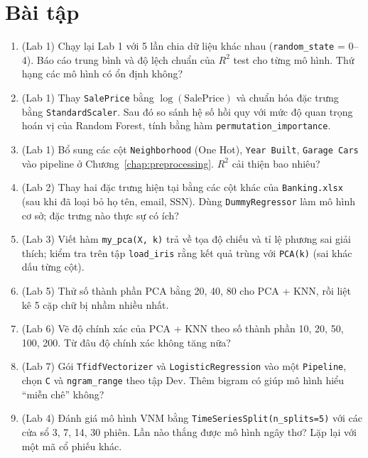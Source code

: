 \section{Bài tập}
\begin{enumerate}
    \item (Lab 1) Chạy lại Lab 1 với 5 lần chia dữ liệu khác nhau (\texttt{random\_state} = 0--4). Báo cáo trung bình và độ lệch chuẩn của $R^2$ test cho từng mô hình. Thứ hạng các mô hình có ổn định không?
    \item (Lab 1) Thay \texttt{SalePrice} bằng $\log(\text{SalePrice})$ và chuẩn hóa đặc trưng bằng \texttt{StandardScaler}. Sau đó so sánh hệ số hồi quy với mức độ quan trọng hoán vị của Random Forest, tính bằng hàm \texttt{permutation\_\allowbreak importance}.
    \item (Lab 1) Bổ sung các cột \texttt{Neighborhood} (One Hot), \texttt{Year Built}, \texttt{Garage Cars} vào pipeline ở Chương~\ref{chap:preprocessing}. $R^2$ cải thiện bao nhiêu?
    \item (Lab 2) Thay hai đặc trưng hiện tại bằng các cột khác của \texttt{Banking.xlsx} (sau khi đã loại bỏ họ tên, email, SSN). Dùng \texttt{DummyRegressor} làm mô hình cơ sở; đặc trưng nào thực sự có ích?
    \item (Lab 3) Viết hàm \texttt{my\_pca(X, k)} trả về tọa độ chiếu và tỉ lệ phương sai giải thích; kiểm tra trên tập \texttt{load\_iris} rằng kết quả trùng với \texttt{PCA(k)} (sai khác dấu từng cột).
    \item (Lab 5) Thử số thành phần PCA bằng 20, 40, 80 cho PCA + KNN, rồi liệt kê 5 cặp chữ bị nhầm nhiều nhất.
    \item (Lab 6) Vẽ độ chính xác của PCA + KNN theo số thành phần 10, 20, 50, 100, 200. Từ đâu độ chính xác không tăng nữa?
    \item (Lab 7) Gói \texttt{TfidfVectorizer} và \texttt{LogisticRegression} vào một \texttt{Pipeline}, chọn \texttt{C} và \texttt{ngram\_range} theo tập Dev. Thêm bigram có giúp mô hình hiểu ``miễn chê'' không?
    \item (Lab 4) Đánh giá mô hình VNM bằng \texttt{TimeSeriesSplit(n\_splits=5)} với các cửa sổ 3, 7, 14, 30 phiên. Lần nào thắng được mô hình ngây thơ? Lặp lại với một mã cổ phiếu khác.
\end{enumerate}

